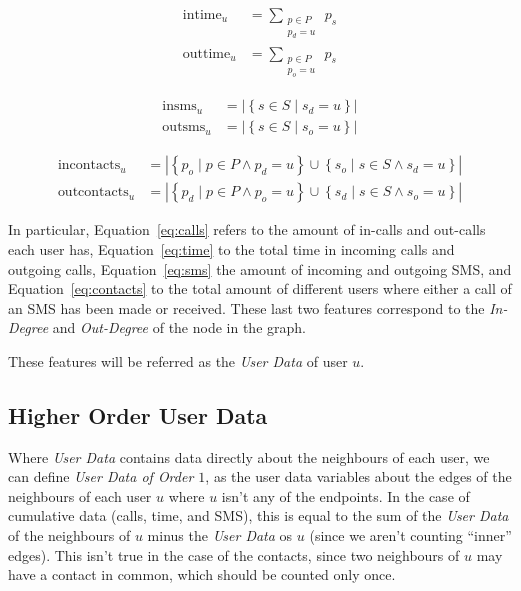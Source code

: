 \begin{equation}
\label{eq:time}
\begin{split}
\operatorname{intime}_u  &= \sum_{\substack{p \in P \\ p_d = u}} \, p_s \\
\operatorname{outtime}_u &= \sum_{\substack{p \in P \\ p_o = u}} \, p_s
\end{split}
\end{equation}

\begin{equation}
\label{eq:sms}
\begin{split}
\operatorname{insms}_u  &= \left| \left\{ s \in S \mid s_d = u \right\} \right| \\
\operatorname{outsms}_u &= \left| \left\{ s \in S \mid s_o = u \right\} \right|
\end{split}
\end{equation}

\begin{equation}
\label{eq:contacts}
\begin{split}
\operatorname{incontacts}_u  &= \left| \left\{ p_o \mid p \in P \land p_d = u \right\} \cup \left\{ s_o \mid s \in S \land s_d = u \right\} \right| \\
\operatorname{outcontacts}_u &= \left| \left\{ p_d \mid p \in P \land p_o = u \right\} \cup \left\{ s_d \mid s \in S \land s_o = u \right\} \right|
\end{split}
\end{equation}

In particular, Equation~\ref{eq:calls} refers to the amount of in-calls and out-calls each user has, Equation~\ref{eq:time} to the total time in incoming calls and outgoing calls, Equation~\ref{eq:sms} the amount of incoming and outgoing SMS, and Equation~\ref{eq:contacts} to the total amount of different users where either a call of an SMS has been made or received. These last two features correspond to the \emph{In-Degree} and \emph{Out-Degree} of the node in the graph.

These features will be referred as the \emph{User Data} of user $u$.

\subsection{Higher Order User Data}
\label{subsec:higherorderuserdata}

Where \emph{User Data} contains data directly about the neighbours of each user, we can define \emph{User Data of Order $1$}, as the user data variables about the edges of the neighbours of each user $u$ where $u$ isn't any of the endpoints. In the case of cumulative data (calls, time, and SMS), this is equal to the sum of the \emph{User Data} of the neighbours of $u$ minus the \emph{User Data} os $u$ (since we aren't counting ``inner'' edges). This isn't true in the case of the contacts, since two neighbours of $u$ may have a contact in common, which should be counted only once.

